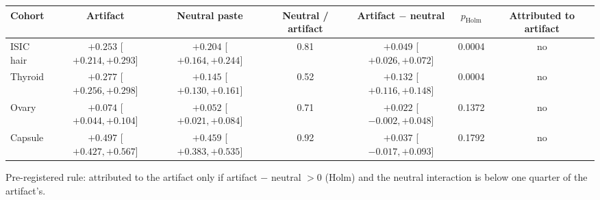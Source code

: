 \begin{center}\small\begin{tabular}{lcccccc}\toprule
Cohort & Artifact & Neutral paste & Neutral / artifact & Artifact $-$ neutral & $p_{\text{Holm}}$ & Attributed to artifact \\\midrule
ISIC hair & $+0.253$ [$+0.214, +0.293$] & $+0.204$ [$+0.164, +0.244$] & 0.81 & $+0.049$ [$+0.026, +0.072$] & 0.0004 & no \\
Thyroid & $+0.277$ [$+0.256, +0.298$] & $+0.145$ [$+0.130, +0.161$] & 0.52 & $+0.132$ [$+0.116, +0.148$] & 0.0004 & no \\
Ovary & $+0.074$ [$+0.044, +0.104$] & $+0.052$ [$+0.021, +0.084$] & 0.71 & $+0.022$ [$-0.002, +0.048$] & 0.1372 & no \\
Capsule & $+0.497$ [$+0.427, +0.567$] & $+0.459$ [$+0.383, +0.535$] & 0.92 & $+0.037$ [$-0.017, +0.093$] & 0.1792 & no \\
\bottomrule\end{tabular}\end{center}
{\footnotesize Pre-registered rule: attributed to the artifact only if artifact $-$ neutral $>0$ (Holm) and the neutral interaction is below one quarter of the artifact's.}
